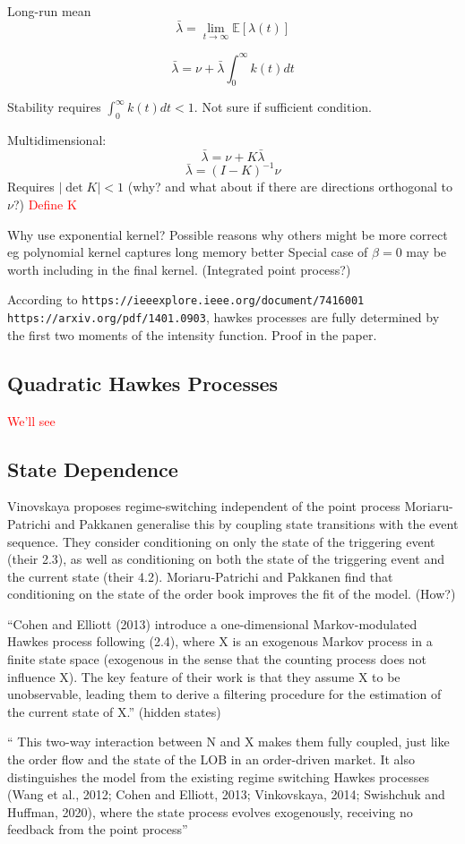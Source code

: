 \documentclass[honours,12pt]{unswthesis}
\numberwithin{equation}{section}
\begin{document}
Long-run mean $$\bar\lambda = \lim_{t\to\infty} \mathbb E\left[\lambda(t)\right]$$

$$\bar\lambda = \nu + \bar\lambda \int_0^\infty k(t)dt$$

Stability requires $\int_0^\infty k(t)dt < 1$. Not sure if sufficient condition.

Multidimensional:
$$\bar\lambda = \nu + K \bar\lambda$$
$$\bar\lambda = (I-K)^{-1}\nu$$
Requires $\vert\det K\vert < 1$ (why? and what about if there are directions orthogonal to $\nu$?)
\textcolor{red}{Define K}

Why use exponential kernel? Possible reasons why others might be more correct eg polynomial kernel captures long memory better
Special case of $\beta=0$ may be worth including in the final kernel. (Integrated point process?)

According to \texttt{https://ieeexplore.ieee.org/document/7416001 https://arxiv.org/pdf/1401.0903}, hawkes processes are fully determined by the first two moments of the intensity function. Proof in the paper.

\subsection{Quadratic Hawkes Processes}
\textcolor{red}{We'll see}

\subsection{State Dependence}
Vinovskaya proposes regime-switching independent of the point process
Moriaru-Patrichi and Pakkanen generalise this by coupling state transitions with the event sequence. They consider conditioning on only the state of the triggering event (their 2.3), as well as conditioning on both the state of the triggering event and the current state (their 4.2).
Moriaru-Patrichi and Pakkanen find that conditioning on the state of the order book improves the fit of the model. (How?)

``Cohen and Elliott (2013) introduce a one-dimensional Markov-modulated Hawkes process following (2.4), where X is an exogenous Markov process in a finite state space (exogenous in the sense that the counting process does not influence X).  The key feature of their work is that they assume X to be unobservable, leading them to derive a filtering procedure for the estimation of the current state of X.'' (hidden states)


`` This two-way interaction between N and X makes them fully coupled, just like the order flow and the state of the LOB in an order-driven market. It also distinguishes the model from the existing regime switching Hawkes processes (Wang et al., 2012; Cohen and Elliott, 2013; Vinkovskaya, 2014; Swishchuk and Huffman, 2020), where the state process evolves exogenously, receiving no feedback from the point process''
\end{document}
